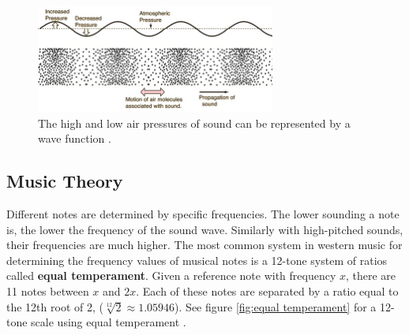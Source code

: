 \documentclass[10pt]{article}
\begin{document}
\begin{figure}[h]
    \centering
    \includegraphics[width=0.7\textwidth]{Sound Waves JPG}
    \caption{The high and low air pressures of sound can be represented by a wave function \cite{nave2017hyperphysics}.} 
    \label{fig:sound wave 1}
\end{figure}

\subsection{Music Theory}
\hspace{\parindent}Different notes are determined by specific frequencies. The lower sounding a note is, the lower the frequency of the sound wave. Similarly with high-pitched sounds, their frequencies are much higher. The most common system in western music for determining the frequency values of musical notes is a 12-tone system of ratios called \textbf{equal temperament}. Given a reference note with frequency $x$, there are 11 notes between $x$ and $2x$. Each of these notes are separated by a ratio equal to the 12th root of 2, ($\sqrt[12]{2}\approx1.05946$). See figure \ref{fig:equal temperament} for a 12-tone scale using equal temperament  \cite{tuningSystems} \cite{boatwright1956musictheory}.

\end{document}
